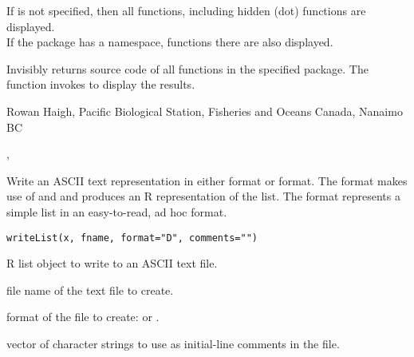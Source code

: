 \documentclass[letterpaper]{book}
\begin{document}
%
\begin{Details}\relax
If  is not specified, then all functions, including
hidden (dot) functions are displayed. \\{}
If the package has a namespace, functions there are also displayed.
\end{Details}
%
\begin{Value}
Invisibly returns source code of all functions in the specified package.
The function invokes  to display the results.
\end{Value}
%
\begin{Author}\relax
Rowan Haigh, Pacific Biological Station, Fisheries and Oceans Canada, Nanaimo BC
\end{Author}
%
\begin{SeeAlso}\relax
 
, 
\end{SeeAlso}
%
\begin{Description}\relax
Write an ASCII text representation in either  format or  format. 
The  format makes use of  and  and produces an R 
representation of the list. The  format represents a simple list in an 
easy-to-read, ad hoc  format.
\end{Description}
%
\begin{Usage}
\begin{verbatim}
writeList(x, fname, format="D", comments="")
\end{verbatim}
\end{Usage}
%
\begin{Arguments}
\begin{ldescription}
\item[\code{x}] R list object to write to an ASCII text file.
\item[\code{fname}] file name of the text file to create.
\item[\code{format}] format of the file to create:  or .
\item[\code{comments}] vector of character strings to use as initial-line comments in the file.
\end{ldescription}
\end{Arguments}
%
\end{document}
